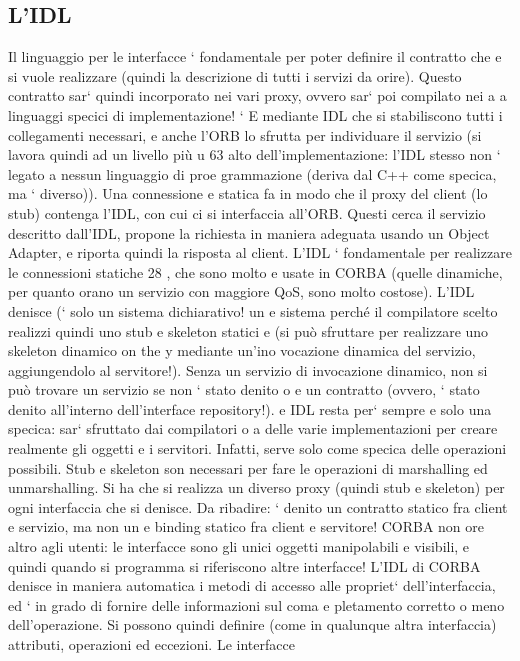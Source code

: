 \documentclass[a4paper,12pt]{article}
\begin{document}
\subsection{L'IDL}
Il linguaggio per le interfacce ` fondamentale per poter definire il contratto che
e
si vuole realizzare (quindi la descrizione di tutti i servizi da orire). Questo
contratto sar` quindi incorporato nei vari proxy, ovvero sar` poi compilato nei
a
a
linguaggi specici di implementazione!
`
E mediante IDL che si stabiliscono tutti i collegamenti necessari, e anche
l'ORB lo sfrutta per individuare il servizio (si lavora quindi ad un livello più
u
63
alto dell'implementazione: l'IDL stesso non ` legato a nessun linguaggio di proe
grammazione (deriva dal C++ come specica, ma ` diverso)). Una connessione
e
statica fa in modo che il proxy del client (lo stub) contenga l'IDL, con cui ci
si interfaccia all'ORB. Questi cerca il servizio descritto dall'IDL, propone la
richiesta in maniera adeguata usando un Object Adapter, e riporta quindi la
risposta al client.
L'IDL ` fondamentale per realizzare le connessioni statiche 28 , che sono molto
e
usate in CORBA (quelle dinamiche, per quanto orano un servizio con maggiore
QoS, sono molto costose). L'IDL denisce (` solo un sistema dichiarativo! un
e
sistema perché il compilatore scelto realizzi quindi uno stub e skeleton statici
e
(si può sfruttare per realizzare uno skeleton dinamico on the y mediante un'ino
vocazione dinamica del servizio, aggiungendolo al servitore!). Senza un servizio
di invocazione dinamico, non si può trovare un servizio se non ` stato denito
o
e
un contratto (ovvero, ` stato denito all'interno dell'interface repository!).
e
IDL resta per` sempre e solo una specica: sar` sfruttato dai compilatori
o
a
delle varie implementazioni per creare realmente gli oggetti e i servitori. Infatti,
serve solo come specica delle operazioni possibili.
Stub e skeleton son necessari per fare le operazioni di marshalling ed unmarshalling. Si ha che si realizza un diverso
proxy (quindi stub e skeleton) per ogni
interfaccia che si denisce.
Da ribadire: ` denito un contratto statico fra client e servizio, ma non un
e
binding statico fra client e servitore!
CORBA non ore altro agli utenti: le interfacce sono gli unici oggetti manipolabili e visibili, e quindi quando si
programma si riferiscono altre interfacce!
L'IDL di CORBA denisce in maniera automatica i metodi di accesso alle
propriet` dell'interfaccia, ed ` in grado di fornire delle informazioni sul coma
e
pletamento corretto o meno dell'operazione. Si possono quindi definire (come
in qualunque altra interfaccia) attributi, operazioni ed eccezioni. Le interfacce
\end{document}
